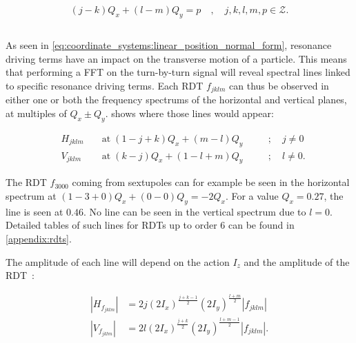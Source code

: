 \begin{equation}
    (j-k)Q_x + (l-m)Q_y = p \quad,\quad j,k,l,m,p \in \mathcal{Z}.
\end{equation}

\FloatBarrier


\subsection{}
\label{section:background:frequency_spectrum}

As seen in \cref{eq:coordinate_systems:linear_position_normal_form}, resonance driving terms have an
impact on the transverse motion of a particle. This means that performing a FFT on the turn-by-turn
signal will reveal spectral lines linked to specific resonance driving terms.
Each RDT $f_{jklm}$ can thus be observed in either one or both the frequency spectrums of the
horizontal and vertical planes, at multiples of $Q_x \pm Q_y$. 
shows where those lines would appear:

\begin{equation}
    \begin{aligned}
    & H_{jklm} \;&&\text{at}\; (1 - j + k)Q_x + (m - l)Q_y \quad&&; \quad j \ne 0 \\
    & V_{jklm}   &&\text{at}\; (k - j)Q_x + (1 - l + m)Q_y      &&; \quad l \ne 0.
    \end{aligned}
    \label{eq:resonances:rdt_spectrum}
\end{equation}

The RDT $f_{3000}$ coming from sextupoles can for example be seen in the horizontal spectrum at
$(1-3+0)Q_x + (0-0)Q_y = -2Q_x$. For a value $Q_x = 0.27$, the line is seen at $0.46$. No line can
be seen in the vertical spectrum due to $l = 0$. Detailed tables of such lines for RDTs up to order
6 can be found in \cref{appendix:rdts}.

The amplitude of each line will depend on the action $I_z$ and the amplitude of the
RDT~\cite{bartolini_normal_1997}:

\begin{equation}
    \begin{aligned}
    |H_{f_{jklm}}| &= 2 j (2 I_x)^\frac{j+k-1}{2} (2 I_y)^\frac{l+m}{2} |f_{jklm}| \\
    |V_{f_{jklm}}| &= 2 l (2 I_x)^\frac{j+k}{2} (2 I_y)^\frac{l+m-1}{2} |f_{jklm}|.
    \end{aligned}
    \label{eq:resonances:amplitude_line}
\end{equation}


